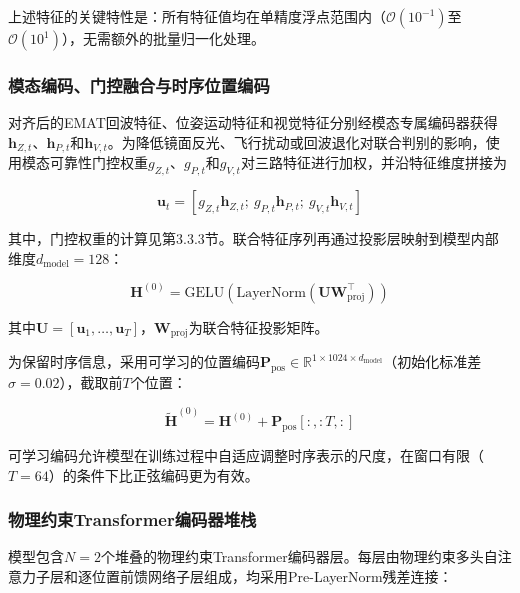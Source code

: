 上述特征的关键特性是：所有特征值均在单精度浮点范围内（$\mathcal{O}(10^{-1})$至$\mathcal{O}(10^{1})$），无需额外的批量归一化处理。

\subsubsection{模态编码、门控融合与时序位置编码}

对齐后的EMAT回波特征、位姿运动特征和视觉特征分别经模态专属编码器获得$\mathbf{h}_{Z,t}$、$\mathbf{h}_{P,t}$和$\mathbf{h}_{V,t}$。为降低镜面反光、飞行扰动或回波退化对联合判别的影响，使用模态可靠性门控权重$g_{Z,t}$、$g_{P,t}$和$g_{V,t}$对三路特征进行加权，并沿特征维度拼接为

\begin{equation}
\mathbf{u}_t = [g_{Z,t}\mathbf{h}_{Z,t};\ g_{P,t}\mathbf{h}_{P,t};\ g_{V,t}\mathbf{h}_{V,t}]
\label{eq:multimodal_fusion_feature}
\end{equation}

其中，门控权重的计算见第3.3.3节。联合特征序列再通过投影层映射到模型内部维度$d_{\text{model}}=128$：

\begin{equation}
\mathbf{H}^{(0)} = \text{GELU}(\text{LayerNorm}(\mathbf{U} \mathbf{W}_{\text{proj}}^{\top}))
\label{eq:input_proj}
\end{equation}

其中$\mathbf{U}=[\mathbf{u}_1,\ldots,\mathbf{u}_T]$，$\mathbf{W}_{\text{proj}}$为联合特征投影矩阵。

为保留时序信息，采用可学习的位置编码$\mathbf{P}_{\text{pos}} \in \mathbb{R}^{1 \times 1024 \times d_{\text{model}}}$（初始化标准差$\sigma = 0.02$），截取前$T$个位置：

\begin{equation}
\tilde{\mathbf{H}}^{(0)} = \mathbf{H}^{(0)} + \mathbf{P}_{\text{pos}}[:, :T, :]
\label{eq:pos_encoding}
\end{equation}

可学习编码允许模型在训练过程中自适应调整时序表示的尺度，在窗口有限（$T = 64$）的条件下比正弦编码更为有效。

\subsubsection{物理约束Transformer编码器堆栈}

模型包含$N = 2$个堆叠的物理约束Transformer编码器层。每层由物理约束多头自注意力子层和逐位置前馈网络子层组成，均采用Pre-LayerNorm残差连接：

